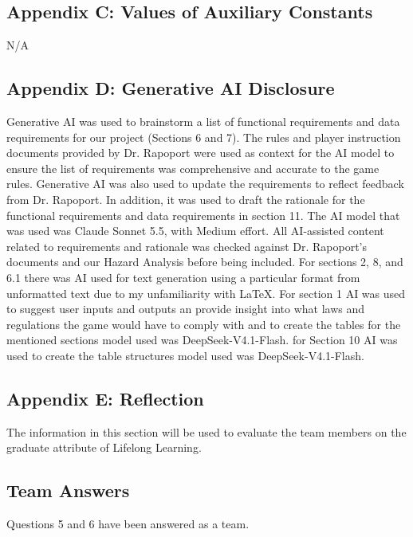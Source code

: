 \documentclass[12pt]{article}
\begin{document}
\subsection{Appendix C: Values of Auxiliary Constants}

N/A

\subsection{Appendix D: Generative AI Disclosure}
  
Generative AI was used to brainstorm a list of functional requirements and data requirements for our project (Sections 6 and 7). The rules and player instruction documents provided by Dr. Rapoport were used as context for the AI model to ensure the list of requirements was comprehensive and accurate to the game rules. Generative AI was also used to update the requirements to reflect feedback from Dr. Rapoport. In addition, it was used to draft the rationale for the functional requirements and data requirements in section 11. The AI model that was used was Claude Sonnet 5.5, with Medium effort. All AI-assisted content related to requirements and rationale was checked against Dr. Rapoport's documents and our Hazard Analysis before being included.
For sections 2, 8, and 6.1 there was AI used for text generation using a particular format from unformatted text due to my unfamiliarity with LaTeX.
For section 1 AI was used to suggest user inputs and outputs an provide insight into what laws and regulations the game would have to comply with and to create the tables for the mentioned sections model used was DeepSeek-V4.1-Flash.
for Section 10 AI was used to create the table structures model used was DeepSeek-V4.1-Flash.

\subsection{Appendix E: Reflection}

The information in this section will be used to evaluate the team members on the
graduate attribute of Lifelong Learning.





\subsection*{Team Answers}

Questions 5 and 6 have been answered as a team.
\end{document}
